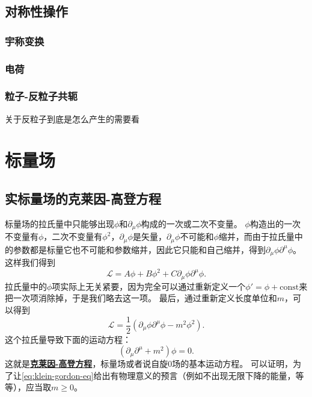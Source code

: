 \documentclass[hyperref, UTF8, a4paper]{ctexart}
\newcommand*{\const}{\mathrm{const}}
\newcommand{\concept}[1]{\underline{\textbf{#1}}}
\begin{document}

\subsection{对称性操作}

\subsubsection{宇称变换}


\subsubsection{电荷}

\subsubsection{粒子-反粒子共轭}

关于反粒子到底是怎么产生的需要看%

\section{标量场}

\subsection{实标量场的克莱因-高登方程}\label{sec:k-g-eq}

标量场的拉氏量中只能够出现$\phi$和$\partial_\mu \phi$构成的一次或二次不变量。
$\phi$构造出的一次不变量有$\phi$，二次不变量有$\phi^2$，$\partial_\mu \phi$是矢量，$\partial_\mu \phi$不可能和$\phi$缩并，而由于拉氏量中的参数都是标量它也不可能和参数缩并，因此它只能和自己缩并，得到$\partial_\mu \phi \partial^\mu \phi$。
这样我们得到
\[
    \mathcal{L} = A \phi + B \phi^2 + C \partial_\mu \phi \partial^\mu \phi.
\]
拉氏量中的$\phi$项实际上无关紧要，因为完全可以通过重新定义一个$\phi' = \phi + \const$来把一次项消除掉，于是我们略去这一项。
最后，通过重新定义长度单位和$m$，可以得到
\begin{equation}
    \mathcal{L} = \frac{1}{2} (\partial_\mu \phi \partial^\mu \phi - m^2 \phi^2).
    \label{eq:klein-gordon-lagrangian}
\end{equation}
这个拉氏量导致下面的运动方程：
\begin{equation}
    (\partial_\mu \partial^\mu + m^2) \phi = 0.
    \label{eq:klein-gordon-eq}
\end{equation}
这就是\concept{克莱因-高登方程}，标量场或者说自旋0场的基本运动方程。
可以证明，为了让\eqref{eq:klein-gordon-eq}给出有物理意义的预言（例如不出现无限下降的能量，等等），应当取$m \geq 0$。
\end{document}
